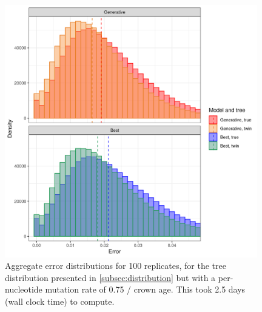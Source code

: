\begin{figure}[H]
  \includegraphics[width=0.98\textwidth]{pirouette_example_37/errors.png}
  \caption{Aggregate error distributions for 100 replicates,
    for the tree distribution presented 
    in \ref{subsec:distribution} but with a per-nucleotide mutation rate 
    of 0.75 / crown age. 
    This took 2.5 days (wall clock time) to compute.}
  \label{fig:example_0.75_mutation_rate}
\end{figure}

